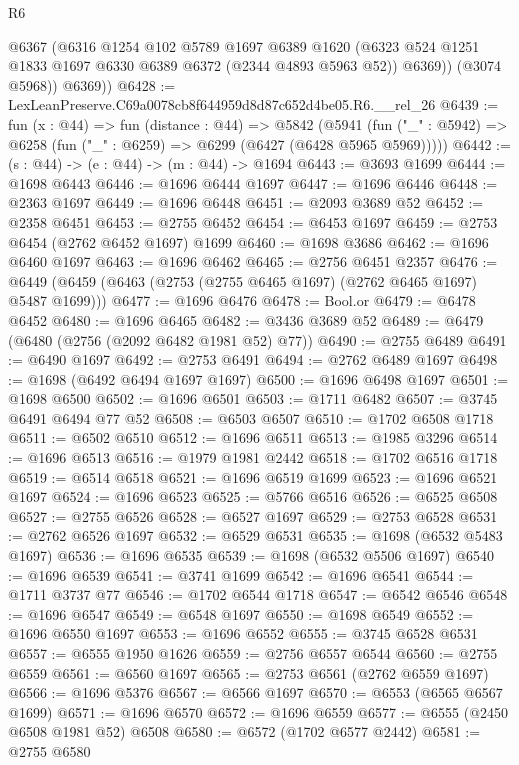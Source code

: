 \begin{lexlean}{R6}
\begin{coremodule}
            @6367
            (@6316
              @1254
              @102
              @5789
              @1697
              @6389
              @1620
              (@6323 @524 @1251 @1833 @1697 @6330 @6389 @6372 (@2344 @4893 @5963 @52))
              @6369))
          (@3074 @5968))
        @6369))
@6428 := LexLeanPreserve.C69a0078cb8f644959d8d87c652d4be05.R6.__rel_26
@6439 := fun (x : @44) =>
  fun (distance : @44) =>
  @5842
    (@5941 (fun ("_" : @5942) => @6258 (fun ("_" : @6259) => @6299 (@6427 (@6428 @5965 @5969)))))
@6442 := (s : @44) -> (e : @44) -> (m : @44) -> @1694
@6443 := @3693 @1699
@6444 := @1698 @6443
@6446 := @1696 @6444 @1697
@6447 := @1696 @6446
@6448 := @2363 @1697
@6449 := @1696 @6448
@6451 := @2093 @3689 @52
@6452 := @2358 @6451
@6453 := @2755 @6452
@6454 := @6453 @1697
@6459 := @2753 @6454 (@2762 @6452 @1697) @1699
@6460 := @1698 @3686
@6462 := @1696 @6460 @1697
@6463 := @1696 @6462
@6465 := @2756 @6451 @2357
@6476 := @6449 (@6459 (@6463 (@2753 (@2755 @6465 @1697) (@2762 @6465 @1697) @5487 @1699)))
@6477 := @1696 @6476
@6478 := Bool.or
@6479 := @6478 @6452
@6480 := @1696 @6465
@6482 := @3436 @3689 @52
@6489 := @6479 (@6480 (@2756 (@2092 @6482 @1981 @52) @77))
@6490 := @2755 @6489
@6491 := @6490 @1697
@6492 := @2753 @6491
@6494 := @2762 @6489 @1697
@6498 := @1698 (@6492 @6494 @1697 @1697)
@6500 := @1696 @6498 @1697
@6501 := @1698 @6500
@6502 := @1696 @6501
@6503 := @1711 @6482
@6507 := @3745 @6491 @6494 @77 @52
@6508 := @6503 @6507
@6510 := @1702 @6508 @1718
@6511 := @6502 @6510
@6512 := @1696 @6511
@6513 := @1985 @3296
@6514 := @1696 @6513
@6516 := @1979 @1981 @2442
@6518 := @1702 @6516 @1718
@6519 := @6514 @6518
@6521 := @1696 @6519 @1699
@6523 := @1696 @6521 @1697
@6524 := @1696 @6523
@6525 := @5766 @6516
@6526 := @6525 @6508
@6527 := @2755 @6526
@6528 := @6527 @1697
@6529 := @2753 @6528
@6531 := @2762 @6526 @1697
@6532 := @6529 @6531
@6535 := @1698 (@6532 @5483 @1697)
@6536 := @1696 @6535
@6539 := @1698 (@6532 @5506 @1697)
@6540 := @1696 @6539
@6541 := @3741 @1699
@6542 := @1696 @6541
@6544 := @1711 @3737 @77
@6546 := @1702 @6544 @1718
@6547 := @6542 @6546
@6548 := @1696 @6547
@6549 := @6548 @1697
@6550 := @1698 @6549
@6552 := @1696 @6550 @1697
@6553 := @1696 @6552
@6555 := @3745 @6528 @6531
@6557 := @6555 @1950 @1626
@6559 := @2756 @6557 @6544
@6560 := @2755 @6559
@6561 := @6560 @1697
@6565 := @2753 @6561 (@2762 @6559 @1697)
@6566 := @1696 @5376
@6567 := @6566 @1697
@6570 := @6553 (@6565 @6567 @1699)
@6571 := @1696 @6570
@6572 := @1696 @6559
@6577 := @6555 (@2450 @6508 @1981 @52) @6508
@6580 := @6572 (@1702 @6577 @2442)
@6581 := @2755 @6580

\end{coremodule}
\end{lexlean}
